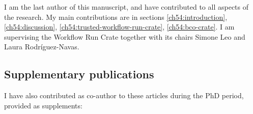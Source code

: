 I am the last author of this manuscript, and have contributed to all aspects of the research. My main contributions are in sections \ref{ch54:introduction}, \ref{ch54:discussion}, \ref{ch54:trusted-workflow-run-crate}, \ref{ch54:bco-crate}. I am supervising the Workflow Run Crate  together with its chairs Simone Leo and Laura Rodríguez-Navas.



\subsection{Supplementary publications}\label{ch10:supplementary-publications}

I have also contributed as co-author to these articles during the PhD
period, provided as supplements:


